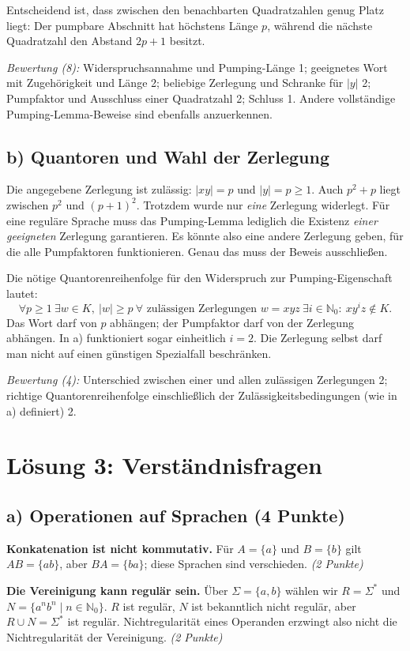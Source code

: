 \documentclass[11pt,a4paper]{article}
\begin{document}
Entscheidend ist, dass zwischen den benachbarten Quadratzahlen genug Platz
liegt: Der pumpbare Abschnitt hat höchstens Länge $p$, während die nächste
Quadratzahl den Abstand $2p+1$ besitzt.

\textit{Bewertung (8):} Widerspruchsannahme und Pumping-Länge 1;
geeignetes Wort mit Zugehörigkeit und Länge 2; beliebige Zerlegung und
Schranke für $|y|$ 2; Pumpfaktor und Ausschluss einer Quadratzahl 2; Schluss 1.
Andere vollständige Pumping-Lemma-Beweise sind ebenfalls anzuerkennen.

\subsection*{b) Quantoren und Wahl der Zerlegung}
Die angegebene Zerlegung ist zulässig: $|xy|=p$ und $|y|=p\geq1$.
Auch $p^2+p$ liegt zwischen $p^2$ und $(p+1)^2$.
Trotzdem wurde nur \emph{eine} Zerlegung widerlegt. Für eine reguläre Sprache
muss das Pumping-Lemma lediglich die Existenz \emph{einer geeigneten}
Zerlegung garantieren. Es könnte also eine andere Zerlegung geben, für die
alle Pumpfaktoren funktionieren. Genau das muss der Beweis ausschließen.

Die nötige Quantorenreihenfolge für den Widerspruch zur Pumping-Eigenschaft
lautet:
\[
 \forall p\geq1\ \exists w\in K,\ |w|\geq p\
 \forall\text{ zulässigen Zerlegungen }w=xyz\
 \exists i\in\mathbb N_0:\ xy^iz\notin K.
\]
Das Wort darf von $p$ abhängen; der Pumpfaktor darf von der Zerlegung
abhängen. In a) funktioniert sogar einheitlich $i=2$.
Die Zerlegung selbst darf man nicht auf einen günstigen Spezialfall
beschränken.

\textit{Bewertung (4):} Unterschied zwischen einer und allen zulässigen
Zerlegungen 2; richtige Quantorenreihenfolge einschließlich der
Zulässigkeitsbedingungen (wie in a) definiert) 2.

\newpage
\section*{Lösung 3: Verständnisfragen}
\subsection*{a) Operationen auf Sprachen (4 Punkte)}
\textbf{Konkatenation ist nicht kommutativ.} Für $A=\{a\}$ und $B=\{b\}$
gilt $AB=\{ab\}$, aber $BA=\{ba\}$; diese Sprachen sind verschieden.
\textit{(2 Punkte)}

\textbf{Die Vereinigung kann regulär sein.} Über $\Sigma=\{a,b\}$ wählen wir
$R=\Sigma^*$ und $N=\{a^nb^n\mid n\in\mathbb N_0\}$.
$R$ ist regulär, $N$ ist bekanntlich nicht regulär, aber
$R\cup N=\Sigma^*$ ist regulär. Nichtregularität eines Operanden erzwingt
also nicht die Nichtregularität der Vereinigung. \textit{(2 Punkte)}
\end{document}
